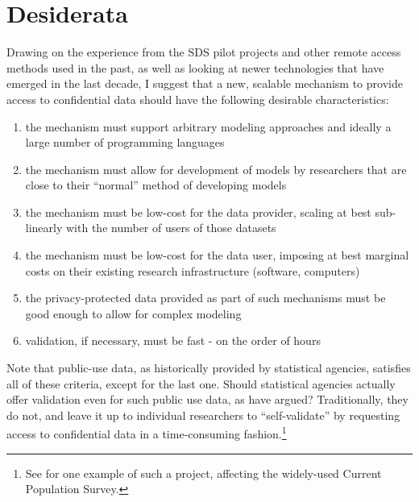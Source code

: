\documentclass[]{hdsr}
\begin{document}
\section{Desiderata}
\label{sec:desiderata}

Drawing on the experience from the SDS pilot projects and other remote access methods used in the past, as well as looking at newer technologies that have emerged in the last decade, I suggest that a new, scalable mechanism to provide access to confidential data should have the following desirable characteristics:

\begin{enumerate}
    \item the mechanism must support arbitrary modeling approaches and ideally a large number of programming languages
    \item the mechanism must allow for development of models by researchers that are close to their ``normal'' method of developing models
    \item the mechanism must be low-cost for the data provider, scaling at best sub-linearly with the number of users of those datasets
    \item the mechanism must be low-cost for the data user, imposing at best marginal costs on their existing research infrastructure (software, computers)
    \item the privacy-protected data provided as part of such mechanisms must be good enough to allow for complex modeling
    \item validation, if necessary, must be fast - on the order of hours
\end{enumerate}

Note that public-use data, as historically provided by statistical agencies, satisfies all of these criteria, except for the last one. Should statistical agencies actually offer validation even for such public use data, as \citet{reiter_verification_2009} have argued? Traditionally, they do not, and leave it up to individual researchers to ``self-validate'' by requesting access to confidential data in a time-consuming fashion.\footnote{See \cite{armour_using_2016} for one example of such a project, affecting the widely-used Current Population Survey.}
\end{document}
